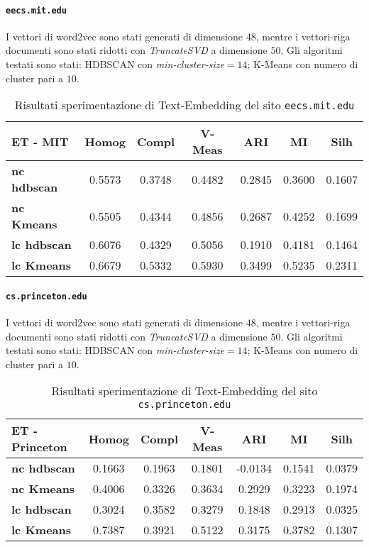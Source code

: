 \paragraph{\texttt{eecs.mit.edu}} I vettori di word2vec sono stati generati di dimensione $48$, mentre i vettori-riga documenti sono stati ridotti con \textit{TruncateSVD} a dimensione $50$. Gli algoritmi testati sono stati: HDBSCAN con \textit{min-cluster-size}$=14$; K-Means con numero di cluster pari a $10$. 


\begin{table}[H]
	\begin{tabular}{| l | c | c | c | c | c | c |}
	\hline
	\textbf{ET - MIT}  & \textbf{Homog} & \textbf{Compl} & \textbf{V-Meas}  & \textbf{ARI}  & \textbf{MI}  & \textbf{Silh} \\ [3ex] 
	\hline
	\textbf{nc hdbscan} & 0.5573 & 0.3748 & 0.4482 & 0.2845 & 0.3600 & 0.1607\\ [3ex]
	 \hline
	\textbf{nc Kmeans} & 0.5505 & 0.4344 & 0.4856 & 0.2687 & 0.4252 & 0.1699\\ [3ex]
	 \hline	
	\textbf{lc hdbscan} & 0.6076 & 0.4329 & 0.5056 & 0.1910 & 0.4181 & 0.1464\\ [3ex]
	\hline
	\textbf{lc Kmeans} & 0.6679 & 0.5332 & 0.5930 & 0.3499 & 0.5235 & 0.2311\\ [3ex]
	\hline
	\end{tabular}
	\caption{Risultati sperimentazione di Text-Embedding del sito \texttt{eecs.mit.edu}}
	\label{metricheTextEmbedMit}
\end{table}

\paragraph{\texttt{cs.princeton.edu}} I vettori di word2vec sono stati generati di dimensione $48$, mentre i vettori-riga documenti sono stati ridotti con \textit{TruncateSVD} a dimensione $50$. Gli algoritmi testati sono stati: HDBSCAN con \textit{min-cluster-size}$=14$; K-Means con numero di cluster pari a $10$. 


\begin{table}[H]
	\begin{tabular}{| l | c | c | c | c | c | c |}
	\hline
	\textbf{ET - Princeton}  & \textbf{Homog} & \textbf{Compl} & \textbf{V-Meas}  & \textbf{ARI}  & \textbf{MI}  & \textbf{Silh} \\ [3ex] 
	\hline
	\textbf{nc hdbscan} & 0.1663 & 0.1963 & 0.1801 & -0.0134 & 0.1541 & 0.0379\\ [3ex]
	 \hline
	\textbf{nc Kmeans} & 0.4006 & 0.3326 & 0.3634 & 0.2929 & 0.3223 & 0.1974\\ [3ex]
	 \hline	
	\textbf{lc hdbscan} & 0.3024 & 0.3582 & 0.3279 & 0.1848 & 0.2913 & 0.0325\\ [3ex]
	\hline
	\textbf{lc Kmeans} & 0.7387 & 0.3921 & 0.5122 & 0.3175 & 0.3782 & 0.1307\\ [3ex]
	\hline
	\end{tabular}
	\caption{Risultati sperimentazione di Text-Embedding del sito \texttt{cs.princeton.edu}}
	\label{metricheTextEmbedPrinc}
\end{table}

